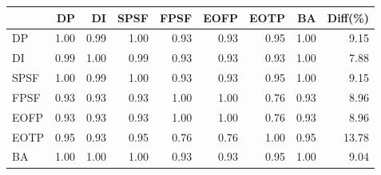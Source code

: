 \begin{tabular}{l|rrrrrrr|r}
\toprule
 & DP & DI & SPSF & FPSF & EOFP & EOTP & BA & Diff(\%)  \\
\midrule
DP & 1.00 & 0.99 & 1.00 & 0.93 & 0.93 & 0.95 & 1.00 & 9.15  \\
DI & 0.99 & 1.00 & 0.99 & 0.93 & 0.93 & 0.93 & 1.00 & 7.88  \\
SPSF & 1.00 & 0.99 & 1.00 & 0.93 & 0.93 & 0.95 & 1.00 & 9.15  \\
FPSF & 0.93 & 0.93 & 0.93 & 1.00 & 1.00 & 0.76 & 0.93 & 8.96  \\
EOFP & 0.93 & 0.93 & 0.93 & 1.00 & 1.00 & 0.76 & 0.93 & 8.96  \\
EOTP & 0.95 & 0.93 & 0.95 & 0.76 & 0.76 & 1.00 & 0.95 & 13.78  \\
BA & 1.00 & 1.00 & 1.00 & 0.93 & 0.93 & 0.95 & 1.00 & 9.04  \\
\bottomrule
\end{tabular}

